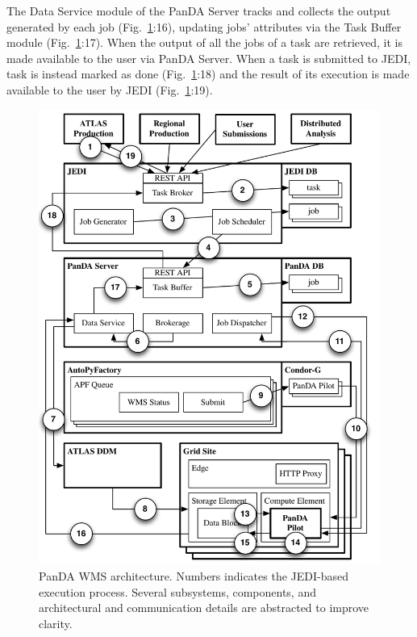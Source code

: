 The Data Service module of the PanDA Server tracks and collects the output
generated by each job (Fig.~\ref{fig:architecture}:16), updating jobs'
attributes via the Task Buffer module (Fig.~\ref{fig:architecture}:17). When the
output of all the jobs of a task are retrieved, it is made available to the user
via PanDA Server. When a task is submitted to JEDI, task is instead marked as
done (Fig.~\ref{fig:architecture}:18) and the result of its execution is made
available to the user by JEDI (Fig.~\ref{fig:architecture}:19).

\begin{figure}
    \centering
    \includegraphics[width=\columnwidth]{figures/panda_architecture.pdf}
    \caption{PanDA WMS architecture. Numbers indicates the JEDI-based execution
    process. Several subsystems, components, and architectural and
    communication details are abstracted to improve clarity.}
\label{fig:architecture}
\end{figure}
